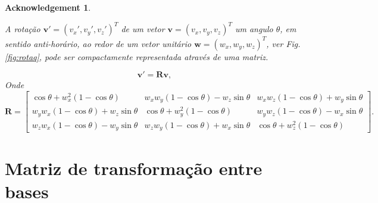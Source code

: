 \documentclass[a4paper,10pt]{report}
\newtheorem{acknowledgement}[theorem]{Acknowledgement}
\begin{document}
\begin{acknowledgement}\label{acknow:giromat}

 A rotação $\mathbf{v}'=(v_x',v_y',v_z')^T$ de um vetor $\mathbf{v}=(v_x,v_y,v_z)^T$ 
 um angulo $\theta$, em sentido anti-horário, 
 ao redor de um vetor unitário $\mathbf{w}=(w_x,w_y,w_z)^T$, ver Fig. \ref{fig:rotaq}, 
 pode ser compactamente representada através de uma matriz.
 
 \begin{equation}
\mathbf{v}' = \mathbf{R} \mathbf{v} , 
\end{equation}
Onde
\begin{equation}
  \mathbf{R} = \begin{bmatrix} \cos \theta +w_x^2 \left(1-\cos \theta\right) & w_x w_y \left(1-\cos \theta\right) - w_z \sin \theta & w_x w_z \left(1-\cos \theta\right) + w_y \sin \theta \\ w_y w_x \left(1-\cos \theta\right) + w_z \sin \theta & \cos \theta + w_y^2\left(1-\cos \theta\right) & w_y w_z \left(1-\cos \theta\right) - w_x \sin \theta \\ w_z w_x \left(1-\cos \theta\right) - w_y \sin \theta & w_z w_y \left(1-\cos \theta\right) + w_x \sin \theta & \cos \theta + w_z^2\left(1-\cos \theta\right) \end{bmatrix}. 
\end{equation}
 
\end{acknowledgement}

\section{Matriz de transformação entre bases}
\end{document}
